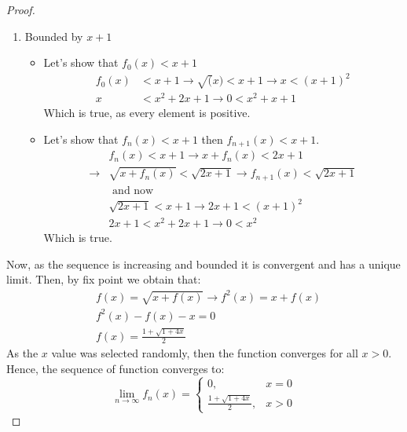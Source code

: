 \documentclass[11pt]{article}
\theoremstyle{definition}
\theoremstyle{remark}
\theoremstyle{remark}
\newcommand{\ri}{\rightarrow}
\begin{document}
\begin{proof}
\begin{enumerate}
  \item Bounded by $x + 1$
    \begin{itemize}
    \item Let's show that $f_0(x) < x + 1$
      \begin{equation*}
        \begin{split}
          f_0(x) &< x + 1 \ri \sqrt(x) < x + 1 \ri x < (x+1)^2 \\
          x &< x^2+2x+1 \ri 0 < x^2 + x + 1
        \end{split}
      \end{equation*}
      Which is true, as every element is positive.
    \item Let's show that $f_n(x) < x + 1$ then $f_{n+1}(x) < x + 1$.
      \begin{equation*}
        \begin{split}
          &f_n(x) < x + 1 \ri x + f_n(x) < 2x + 1 \\
          \ri& \sqrt{x + f_n(x)} < \sqrt{2x+1} \ri f_{n+1}(x) <
          \sqrt{2x+1} \\
          & \text{ and now} \\
          &\sqrt{2x + 1} < x + 1 \ri 2x+1 < (x+1)^2 \\
          &2x+1 < x^2+2x+1 \ri 0 < x^2
        \end{split}
      \end{equation*}
      Which is true.
    \end{itemize}
  \end{enumerate}
  Now, as the sequence is increasing and bounded it is convergent and
  has a unique limit. Then, by fix point we obtain that:
  \begin{equation*}
    \begin{split}
      &f(x) = \sqrt{x + f(x)} \ri f^2(x) = x + f(x) \\
      &f^2(x) - f(x) - x = 0 \\
      &f(x) = \frac{1 + \sqrt{1+4x}}{2}
    \end{split}
  \end{equation*}
  As the $x$ value was selected randomly, then the function converges
  for all $x > 0$. Hence, the sequence of function converges to:
  \begin{equation*}
    \lim_{n \ri \infty} f_n(x) =
    \begin{cases}
      0, &x=0 \\
      \frac{1 + \sqrt{1+4x}}{2}, &x > 0
    \end{cases}
  \end{equation*}
\end{proof}
\end{document}
